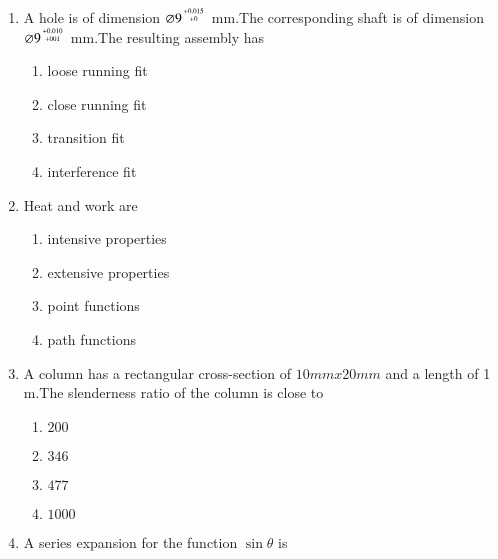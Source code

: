 \documentclass[journal,12pt,onecolumn]{IEEEtran}
\theoremstyle{remark}
\begin{document}
\begin{enumerate}
\begin{multicols}{2}
\begin{enumerate}
         \item impregnation
         \item infiltration
     \end{enumerate}
         \end{multicols}
     \item A hole is of dimension  $\varnothing 9^{\genfrac{}{}{0pt}{}{+0.015}{+0}}$  mm.The corresponding shaft is of dimension $\varnothing 9^{\genfrac{}{}{0pt}{}{+0.010}{+001}}$ mm.The resulting assembly has
         \begin{multicols}{2}
     \begin{enumerate}
         \item loose running fit
         \item close running fit
         \item transition fit
         \item interference fit
         \end{enumerate}
             \end{multicols}
         \item Heat and work are
             \begin{multicols}{2}
         \begin{enumerate}
             \item intensive properties
             \item extensive properties
             \item point functions
             \item path functions
             \end{enumerate}
                 \end{multicols}
             \item A column has a rectangular cross-section of $10 mmx 20 mm$ and a length of 1 m.The slenderness ratio of the column is close to
                 \begin{multicols}{2}
             \begin{enumerate}
                 \item $200$
                 \item $346$
                 \item $477$
                 \item $1000$
             \end{enumerate}
                 \end{multicols}
             \item A series expansion for the function $\sin \theta$ is
                 \begin{multicols}{2}

\end{multicols}
\end{enumerate}
\end{document}
